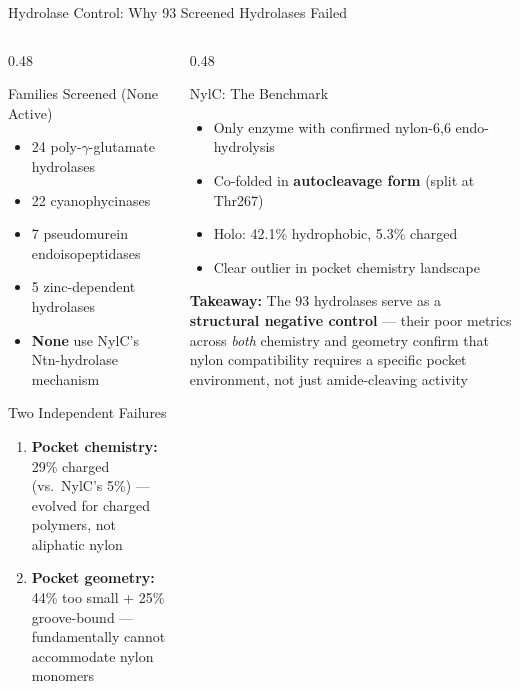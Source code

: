 \documentclass[aspectratio=169, 11pt]{beamer}
\begin{document}
\begin{frame}{Hydrolase Control: Why 93 Screened Hydrolases Failed}
\vspace{-4pt}
\begin{columns}[T]
\begin{column}{0.48\textwidth}
\begin{block}{Families Screened (None Active)}
\begin{itemize}\small
\item 24 poly-$\gamma$-glutamate hydrolases
\item 22 cyanophycinases
\item 7 pseudomurein endoisopeptidases
\item 5 zinc-dependent hydrolases
\item \textbf{None} use NylC's Ntn-hydrolase mechanism
\end{itemize}
\end{block}

\begin{alertblock}{Two Independent Failures}
\begin{enumerate}\small
\item \textbf{Pocket chemistry:} 29\% charged (vs.\ NylC's 5\%) --- evolved for charged polymers, not aliphatic nylon
\item \textbf{Pocket geometry:} 44\% too small + 25\% groove-bound --- fundamentally cannot accommodate nylon monomers
\end{enumerate}
\end{alertblock}
\end{column}

\begin{column}{0.48\textwidth}
\begin{exampleblock}{NylC: The Benchmark}
\begin{itemize}\small
\item Only enzyme with confirmed nylon-6,6 endo-hydrolysis
\item Co-folded in \textbf{autocleavage form} (split at Thr267)
\item Holo: 42.1\% hydrophobic, 5.3\% charged
\item Clear outlier in pocket chemistry landscape
\end{itemize}
\end{exampleblock}

\vspace{4pt}
\colorbox{lightblue!50}{\parbox{0.92\textwidth}{\centering\small
\textbf{Takeaway:} The 93 hydrolases serve as a \textbf{structural negative control} --- their poor metrics across \textit{both} chemistry and geometry confirm that nylon compatibility requires a specific pocket environment, not just amide-cleaving activity
}}
\end{column}
\end{columns}
\end{frame}
\end{document}
